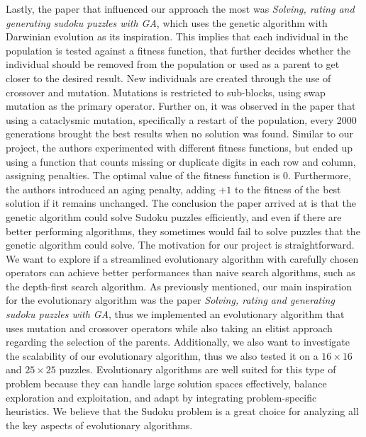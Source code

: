 {\newline Lastly, the paper that influenced our approach the most was \textit{Solving, rating and generating sudoku puzzles with GA}, which uses the genetic algorithm with Darwinian evolution as its inspiration\cite{Mantere2007}. This implies that each individual in the population is tested against a fitness function, that further decides whether the individual should be removed from the population or used as a parent to get closer to the desired result.
New individuals are created through the use of crossover and mutation. Mutations is restricted to sub-blocks, using swap mutation as the primary operator. Further on, it was observed in the paper that using a cataclysmic mutation, specifically a restart of the population, every 2000 generations brought the best results when no solution was found. Similar to our project, the authors experimented with different fitness functions, but ended up using a function that counts missing or duplicate digits in each row and column, assigning penalties. The optimal value of the fitness function is 0. Furthermore, the authors introduced an aging penalty, adding $+1$ to the fitness of the best solution if it remains unchanged.
The conclusion the paper arrived at is that the genetic algorithm could solve Sudoku puzzles efficiently, and even if there are better performing algorithms, they sometimes would fail to solve puzzles that the genetic algorithm could solve.}
{\newline}
{\newline The motivation for our project is straightforward. We want to explore if a streamlined evolutionary algorithm with carefully chosen operators can achieve better performances than naive search algorithms, such as the depth-first search algorithm. As previously mentioned, our main inspiration for the evolutionary algorithm was the paper \textit{Solving, rating and generating sudoku puzzles with GA}, thus we implemented an evolutionary algorithm that uses mutation and crossover operators while also taking an elitist approach regarding the selection of the parents\cite{Mantere2007}.
Additionally, we also want to investigate the scalability of our evolutionary algorithm, thus we also tested it on a $16 \times 16$ and $25 \times 25$ puzzles. Evolutionary algorithms are well suited for this type of problem because they can handle large solution spaces effectively, balance exploration and exploitation, and adapt by integrating problem-specific heuristics.
We believe that the Sudoku problem is a great choice for analyzing all the key aspects of evolutionary algorithms.}

